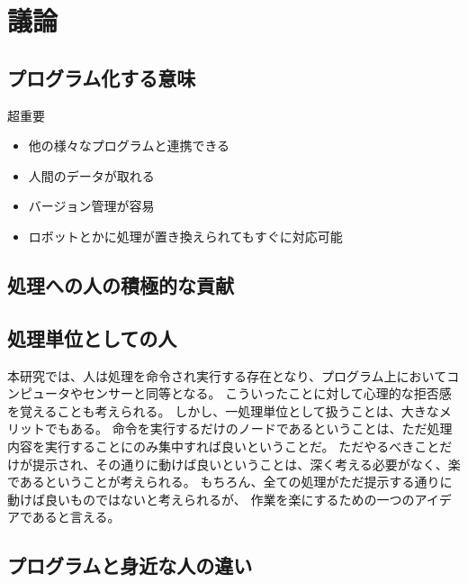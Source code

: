 \chapter{議論}\label{chap:discussion}

\section{プログラム化する意味}\label{ux30d7ux30edux30b0ux30e9ux30e0ux5316ux3059ux308bux610fux5473}

超重要

\begin{itemize}
\itemsep1pt\parskip0pt
\item
  他の様々なプログラムと連携できる
\item
  人間のデータが取れる
\item
  バージョン管理が容易
\item
  ロボットとかに処理が置き換えられてもすぐに対応可能
\end{itemize}

\section{処理への人の積極的な貢献}\label{ux51e6ux7406ux3078ux306eux4ebaux306eux7a4dux6975ux7684ux306aux8ca2ux732e}

\section{処理単位としての人}\label{ux51e6ux7406ux5358ux4f4dux3068ux3057ux3066ux306eux4eba}

本研究では、人は処理を命令され実行する存在となり、プログラム上においてコンピュータやセンサーと同等となる。
こういったことに対して心理的な拒否感を覚えることも考えられる。
しかし、一処理単位として扱うことは、大きなメリットでもある。
命令を実行するだけのノードであるということは、ただ処理内容を実行することにのみ集中すれば良いということだ。
ただやるべきことだけが提示され、その通りに動けば良いということは、深く考える必要がなく、楽であるということが考えられる。
もちろん、全ての処理がただ提示する通りに動けば良いものではないと考えられるが、
作業を楽にするための一つのアイデアであると言える。

\section{プログラムと身近な人の違い}\label{ux30d7ux30edux30b0ux30e9ux30e0ux3068ux8eabux8fd1ux306aux4ebaux306eux9055ux3044}

